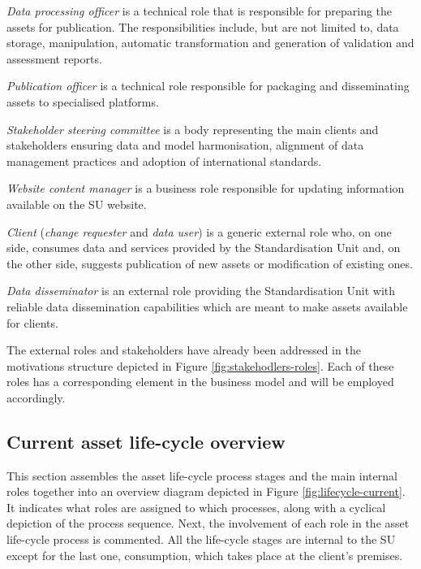 	\textit{Data processing officer} is a technical role that is responsible for preparing the assets for publication. The responsibilities include, but are not limited to, data storage, manipulation, automatic transformation and generation of validation and assessment reports. 
	
	\textit{Publication officer} is a technical role responsible for packaging and disseminating assets to specialised platforms.
	
	\textit{Stakeholder steering committee} is a body representing the main clients and stakeholders ensuring data and model harmonisation, alignment of data management practices and adoption of international standards.
	
	\textit{Website content manager} is a business role responsible for updating information available on the SU website. 
	
	\textit{Client} (\textit{change requester} and \textit{data user}) is a generic external role who, on one side, consumes data and services provided by the Standardisation Unit and, on the other side, suggests publication of new assets or modification of existing ones. 
	
	\textit{Data disseminator} is an external role providing the Standardisation Unit with reliable data dissemination capabilities which are meant to make assets available for clients.

	The external roles and stakeholders have already been addressed in the motivations structure depicted in Figure \ref{fig:stakehodlers-roles}. Each of these roles has a corresponding element in the business model and will be employed accordingly.

    
	\subsection{Current asset life-cycle overview}
	\label{sec:lifecycle-current}
	
	This section assembles the asset life-cycle process stages and the main internal roles together into an overview diagram depicted in Figure \ref{fig:lifecycle-current}. It indicates what roles are assigned to which processes, along with a cyclical depiction of the process sequence. Next, the involvement of each role in the asset life-cycle process is commented. All the life-cycle stages are internal to the SU except for the last one, consumption, which takes place at the client's premises.
	
